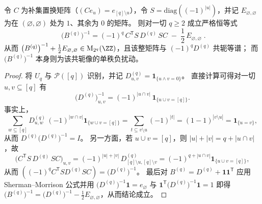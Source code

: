 \begin{conclusion}\label{con:xi-terminal-disjointness-bq-complement-selfdual-inverse-rankone}
令 \(C\) 为补集置换矩阵（\((Ce_u)=e_{[q]\setminus u}\)），令 \(S=\mathrm{diag}(({-1})^{|u|})\)，并记 \(E_{\varnothing,\varnothing}\) 为在 \((\varnothing,\varnothing)\) 处为 \(1\)、其余为 \(0\) 的矩阵。
则对一切 \(q\ge 2\) 成立严格恒等式
\[
\boxed{\;
\bigl(B^{(q)}\bigr)^{-1}
=(-1)^{q}\,C^{\mathsf T}S\,D^{(q)}\,S C\;-\;\frac12\,E_{\varnothing,\varnothing}\; }.
\]
从而
\(
\bigl(B^{(q)}\bigr)^{-1}+\frac12E_{\varnothing,\varnothing}\in \mathrm{M}_{2^q}(\ZZ)
\)，且该整矩阵与 \((-1)^qD^{(q)}\) 共轭等谱；
而 \(\bigl(B^{(q)}\bigr)^{-1}\) 本身则为该共轭像的单秩负扰动。
\end{conclusion}
\begin{proof}
将 \(U_q\) 与 \(\mathcal P([q])\) 识别，并记 \(D^{(q)}_{u,v}=\mathbf{1}_{\{u\wedge v=0\}}\)。
直接计算可得对一切 \(u,v\subseteq[q]\) 有
\[
\bigl(D^{(q)}\bigr)^{-1}_{u,v}
=(-1)^{|u\cap v|}\,\mathbf{1}_{\{u\cup v=[q]\}}.
\]
事实上，
\[
\sum_{w\subseteq[q]}D^{(q)}_{u,w}\,(-1)^{|w\cap v|}\mathbf{1}_{\{w\cup v=[q]\}}
=\sum_{t\subseteq v\setminus u}(-1)^{|t|}
=(1-1)^{|v\setminus u|}
=\mathbf{1}_{\{u=v\}},
\]
从而 \(D^{(q)}\bigl(D^{(q)}\bigr)^{-1}=I\)。
另一方面，若 \(u\cup v=[q]\)，则 \(|u|+|v|=q+|u\cap v|\)，故
\[
\bigl(C^{\mathsf T}S\,D^{(q)}\,S C\bigr)_{u,v}
=(-1)^{|u|+|v|}\,D^{(q)}_{[q]\setminus u,[q]\setminus v}
=(-1)^{q+|u\cap v|}\mathbf{1}_{\{u\cup v=[q]\}},
\]
从而 \(((-1)^q C^{\mathsf T}S D^{(q)} S C)=\bigl(D^{(q)}\bigr)^{-1}\)。
最后对 \(B^{(q)}=D^{(q)}+\mathbf{1}\mathbf{1}^{\mathsf T}\) 应用 Sherman--Morrison 公式并用
\(
\bigl(D^{(q)}\bigr)^{-1}\mathbf{1}=e_{\varnothing}
\)
与
\(
\mathbf{1}^{\mathsf T}\bigl(D^{(q)}\bigr)^{-1}\mathbf{1}=1
\)
即得
\(
\bigl(B^{(q)}\bigr)^{-1}
=\bigl(D^{(q)}\bigr)^{-1}-\frac12E_{\varnothing,\varnothing}
\)，从而结论成立。
\end{proof}

